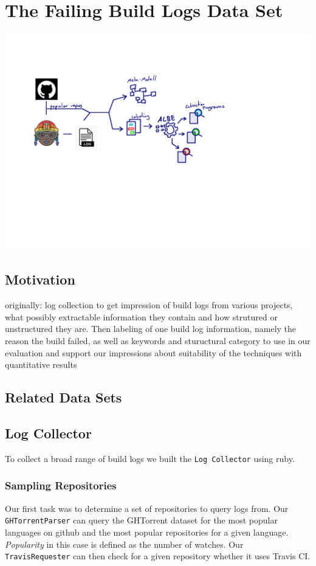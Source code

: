 \documentclass[\myrootdir/main.tex]{subfiles}
\begin{document}
\chapter{The Failing Build Logs Data Set}
\includegraphics[page=5, width=\textwidth, trim={0.5cm 0.5cm 0.5cm 0.5cm}, clip]{img/flow-of-research.pdf}

\label{sec:data-set}
\section{Motivation}
originally: log collection to get impression of build logs from various projects, what possibly extractable information they contain and how strutured or unstructured they are.
Then labeling of one build log information, namely the reason the build failed, as well as keywords and stuructural category to use in our evaluation and support our impressions about suitability of the techniques with quantitative results

\section{Related Data Sets}

\section{Log Collector}
To collect a broad range of build logs we built the \texttt{Log Collector} using ruby.

\subsection{Sampling Repositories}
Our first task was to determine a set of repositories to query logs from. Our \texttt{GHTorrentParser} can query the GHTorrent dataset for the most popular languages on github and the most popular repositories for a given language. \emph{Popularity} in this case is defined as the number of watches. Our \texttt{TravisRequester} can then check for a given repository whether it uses Travis CI.
\end{document}
